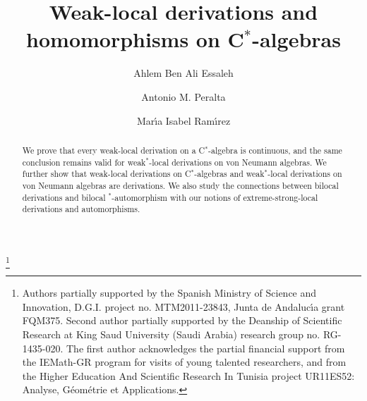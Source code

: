 \documentclass[11pt]{amsart}
\begin{document}
\title{Weak-local derivations and homomorphisms on C$^*$-algebras}

\author[Ben Ali Essaleh]{Ahlem Ben Ali Essaleh}
\address{Faculte des Sciences de Monastir, Département de Mathématiques, Avenue de L'environnement, 5019 Monastir, Tunisia}

\author[Peralta]{Antonio M. Peralta}
\address{Departamento de An{\'a}lisis Matem{\'a}tico, Facultad de
Ciencias, Universidad de Granada, 18071 Granada, Spain.}

\author[Ram\'{i}rez]{Mar{\'\i}a Isabel Ram{\'\i}rez}
\address{Departamento Matem\'aticas, Universidad de
Almer\'ia, 04120 Almer\'ia, Spain} 

\thanks{Authors partially supported by the Spanish Ministry of Science and Innovation,
D.G.I. project no. MTM2011-23843, Junta de Andaluc\'{\i}a grant FQM375. Second author partially supported by the Deanship of Scientific Research at King Saud University (Saudi Arabia) research group no. RG-1435-020. The first author acknowledges the partial financial support from the IEMath-GR program for visits of young talented researchers, and from the Higher Education And Scientific Research In Tunisia project UR11ES52: Analyse, Géométrie et Applications.}


\begin{abstract} We prove that every weak-local derivation on a C$^*$-algebra is continuous, and the same conclusion remains valid for weak$^*$-local derivations on von Neumann algebras. We further show that weak-local derivations on C$^*$-algebras and weak$^*$-local derivations on von Neumann algebras are derivations. We also study the connections between bilocal derivations and bilocal $^*$-automorphism with our notions of extreme-strong-local derivations and automorphisms.
\end{abstract}

\keywords{}

\maketitle
 \thispagestyle{empty}
\end{document}
